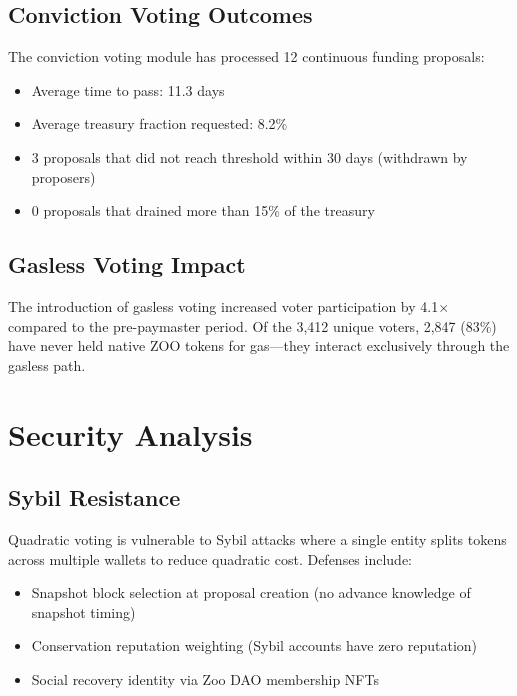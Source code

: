 \documentclass[11pt,letterpaper]{article}
\begin{document}
\subsection{Conviction Voting Outcomes}

The conviction voting module has processed 12 continuous funding proposals:

\begin{itemize}
    \item Average time to pass: 11.3 days
    \item Average treasury fraction requested: 8.2\%
    \item 3 proposals that did not reach threshold within 30 days (withdrawn by proposers)
    \item 0 proposals that drained more than 15\% of the treasury
\end{itemize}

\subsection{Gasless Voting Impact}

The introduction of gasless voting increased voter participation by 4.1$\times$ compared to the pre-paymaster period. Of the 3,412 unique voters, 2,847 (83\%) have never held native ZOO tokens for gas---they interact exclusively through the gasless path.

\section{Security Analysis}

\subsection{Sybil Resistance}

Quadratic voting is vulnerable to Sybil attacks where a single entity splits tokens across multiple wallets to reduce quadratic cost. Defenses include:

\begin{itemize}
    \item Snapshot block selection at proposal creation (no advance knowledge of snapshot timing)
    \item Conservation reputation weighting (Sybil accounts have zero reputation)
    \item Social recovery identity via Zoo DAO membership NFTs
\end{itemize}
\end{document}
